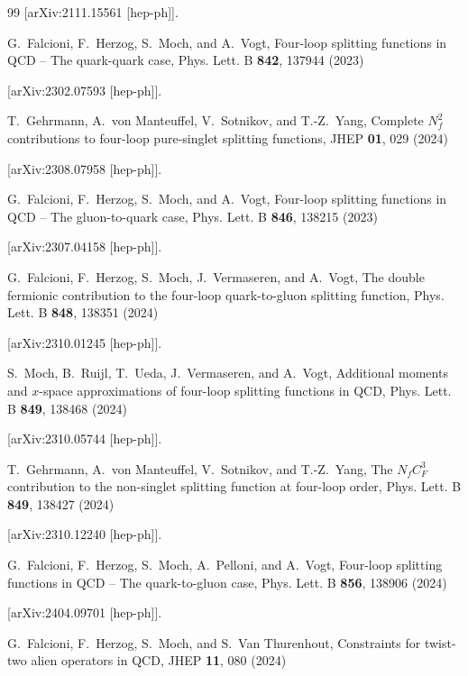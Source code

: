 \documentclass[
 twocolumn,
 superscriptaddress,
 preprintnumbers,
 nofootinbib,
 amsmath,amssymb,
 aps,
 prl
 ]{revtex4-2}
\begin{document}
\begin{thebibliography}{99}
[arXiv:2111.15561 [hep-ph]].



G.~Falcioni, F.~Herzog, S.~Moch, and A.~Vogt,
Four-loop splitting functions in QCD -- The quark-quark case,
Phys. Lett. B \textbf{842}, 137944 (2023)

[arXiv:2302.07593 [hep-ph]].



T.~Gehrmann, A.~von Manteuffel, V.~Sotnikov, and T.-Z.~Yang,
Complete ${N}_f^2$ contributions to four-loop pure-singlet splitting functions,
JHEP \textbf{01}, 029 (2024)

[arXiv:2308.07958 [hep-ph]].



G.~Falcioni, F.~Herzog, S.~Moch, and A.~Vogt,
Four-loop splitting functions in QCD -- The gluon-to-quark case,
Phys. Lett. B \textbf{846}, 138215 (2023)

[arXiv:2307.04158 [hep-ph]].



G.~Falcioni, F.~Herzog, S.~Moch, J.~Vermaseren, and A.~Vogt,
The double fermionic contribution to the four-loop quark-to-gluon splitting function,
Phys. Lett. B \textbf{848}, 138351 (2024)

[arXiv:2310.01245 [hep-ph]].



S.~Moch, B.~Ruijl, T.~Ueda, J.~Vermaseren, and A.~Vogt,
Additional moments and $x$-space approximations of four-loop splitting functions in QCD,
Phys. Lett. B \textbf{849}, 138468 (2024)

[arXiv:2310.05744 [hep-ph]].



T.~Gehrmann, A.~von Manteuffel, V.~Sotnikov, and T.-Z.~Yang,
The $N_fC_F^3$ contribution to the non-singlet splitting function at four-loop order,
Phys. Lett. B \textbf{849}, 138427 (2024)

[arXiv:2310.12240 [hep-ph]].



G.~Falcioni, F.~Herzog, S.~Moch, A.~Pelloni, and A.~Vogt,
Four-loop splitting functions in QCD -- The quark-to-gluon case,
Phys. Lett. B \textbf{856}, 138906 (2024)

[arXiv:2404.09701 [hep-ph]].



G.~Falcioni, F.~Herzog, S.~Moch, and S.~Van Thurenhout,
Constraints for twist-two alien operators in QCD,
JHEP \textbf{11}, 080 (2024)


\end{thebibliography}
\end{document}
